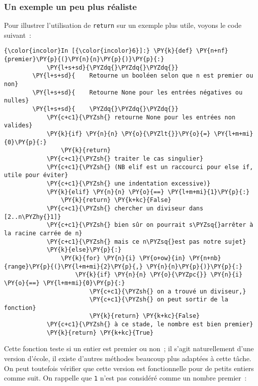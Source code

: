     \hypertarget{un-exemple-un-peu-plus-ruxe9aliste}{%
\subsubsection{Un exemple un peu plus
réaliste}\label{un-exemple-un-peu-plus-ruxe9aliste}}

    Pour illustrer l'utilisation de \texttt{return} sur un exemple plus
utile, voyons le code suivant~:

    \begin{Verbatim}[commandchars=\\\{\}]
{\color{incolor}In [{\color{incolor}6}]:} \PY{k}{def} \PY{n+nf}{premier}\PY{p}{(}\PY{n}{n}\PY{p}{)}\PY{p}{:}
            \PY{l+s+sd}{\PYZdq{}\PYZdq{}\PYZdq{}}
        \PY{l+s+sd}{    Retourne un booléen selon que n est premier ou non}
        \PY{l+s+sd}{    Retourne None pour les entrées négatives ou nulles}
        \PY{l+s+sd}{    \PYZdq{}\PYZdq{}\PYZdq{}}
            \PY{c+c1}{\PYZsh{} retourne None pour les entrées non valides}
            \PY{k}{if} \PY{n}{n} \PY{o}{\PYZlt{}}\PY{o}{=} \PY{l+m+mi}{0}\PY{p}{:}
                \PY{k}{return}
            \PY{c+c1}{\PYZsh{} traiter le cas singulier}
            \PY{c+c1}{\PYZsh{} (NB elif est un raccourci pour else if, utile pour éviter}
            \PY{c+c1}{\PYZsh{} une indentation excessive)}
            \PY{k}{elif} \PY{n}{n} \PY{o}{==} \PY{l+m+mi}{1}\PY{p}{:}
                \PY{k}{return} \PY{k+kc}{False}
            \PY{c+c1}{\PYZsh{} chercher un diviseur dans [2..n\PYZhy{}1]}
            \PY{c+c1}{\PYZsh{} bien sûr on pourrait s\PYZsq{}arrêter à la racine carrée de n}
            \PY{c+c1}{\PYZsh{} mais ce n\PYZsq{}est pas notre sujet}
            \PY{k}{else}\PY{p}{:}
                \PY{k}{for} \PY{n}{i} \PY{o+ow}{in} \PY{n+nb}{range}\PY{p}{(}\PY{l+m+mi}{2}\PY{p}{,} \PY{n}{n}\PY{p}{)}\PY{p}{:}
                    \PY{k}{if} \PY{n}{n} \PY{o}{\PYZpc{}} \PY{n}{i} \PY{o}{==} \PY{l+m+mi}{0}\PY{p}{:}
                        \PY{c+c1}{\PYZsh{} on a trouvé un diviseur,}
                        \PY{c+c1}{\PYZsh{} on peut sortir de la fonction}
                        \PY{k}{return} \PY{k+kc}{False}
            \PY{c+c1}{\PYZsh{} à ce stade, le nombre est bien premier}
            \PY{k}{return} \PY{k+kc}{True}
\end{Verbatim}


    Cette fonction teste si un entier est premier ou non~; il s'agit
naturellement d'une version d'école, il existe d'autres méthodes
beaucoup plus adaptées à cette tâche. On peut toutefois vérifier que
cette version est fonctionnelle pour de petits entiers comme suit. On
rappelle que \texttt{1} n'est pas considéré comme un nombre premier~:

